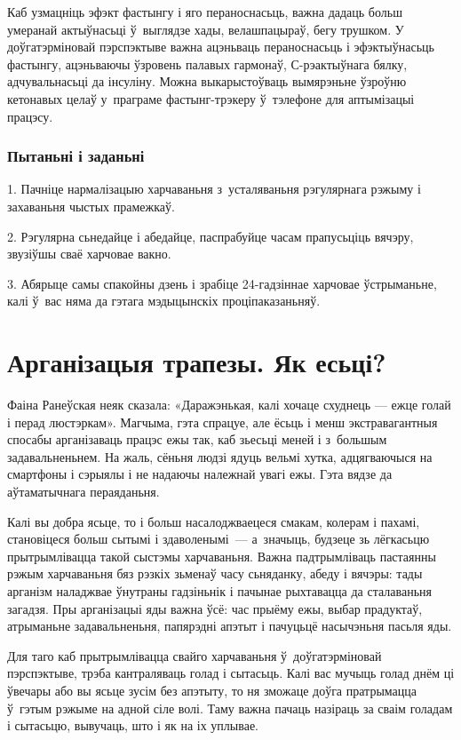 Каб узмацніць эфэкт фастынгу і яго пераноснасьць, важна дадаць больш умеранай актыўнасьці ў~выглядзе хады, велашпацыраў, бегу трушком. У доўгатэрміновай пэрспэктыве важна ацэньваць пераноснасьць і эфэктыўнасьць фастынгу, ацэньваючы ўзровень палавых гармонаў, С-рэактыўнага бялку, адчувальнасьці да інсуліну. Можна выкарыстоўваць вымярэньне ўзроўню кетонавых целаў у~праграме фастынг-трэкеру ў~тэлефоне для аптымізацыі працэсу.

\subsubsection{Пытаньні і заданьні}

1. Пачніце нармалізацыю харчаваньня з~усталяваньня рэгулярнага рэжыму і захаваньня чыстых прамежкаў.

2. Рэгулярна сьнедайце і абедайце, паспрабуйце часам прапусьціць вячэру, звузіўшы сваё харчовае вакно.

3. Абярыце самы спакойны дзень і зрабіце 24-гадзіннае харчовае ўстрыманьне, калі ў~вас няма да гэтага мэдыцынскіх проціпаказаньняў.


\section{Арганізацыя трапезы. Як есьці?}

Фаіна Ранеўская неяк сказала: «Даражэнькая, калі хочаце схуднець — ежце голай і перад люстэркам». Магчыма, гэта спрацуе, але ёсьць і менш экстравагантныя спосабы арганізаваць працэс ежы так, каб зьесьці меней і з~большым задавальненьнем. На жаль, сёньня людзі ядуць вельмі хутка, адцягваючыся на смартфоны і сэрыялы і не надаючы належнай увагі ежы. Гэта вядзе да аўтаматычнага пераяданьня.

Калі вы добра ясьце, то і больш насалоджваецеся смакам, колерам і пахамі, становіцеся больш сытымі і здаволенымі~--- а~значыць, будзеце зь лёгкасьцю прытрымлівацца такой сыстэмы харчаваньня. Важна падтрымліваць пастаянны рэжым харчаваньня бяз рэзкіх зьменаў часу сьняданку, абеду і вячэры: тады арганізм наладжвае ўнутраны гадзіньнік і пачынае рыхтавацца да сталаваньня загадзя. Пры арганізацыі яды важна ўсё: час прыёму ежы, выбар прадуктаў, атрыманьне задавальненьня, папярэдні апэтыт і пачуцьцё насычэньня пасьля яды.

Для таго каб прытрымлівацца свайго харчаваньня ў~доўгатэрміновай пэрспэктыве, трэба кантраляваць голад і сытасьць. Калі вас мучыць голад днём ці ўвечары або вы ясьце зусім без апэтыту, то ня зможаце доўга пратрымацца ў~гэтым рэжыме на адной сіле волі. Таму важна пачаць назіраць за сваім голадам і сытасьцю, вывучаць, што і як на іх уплывае.

